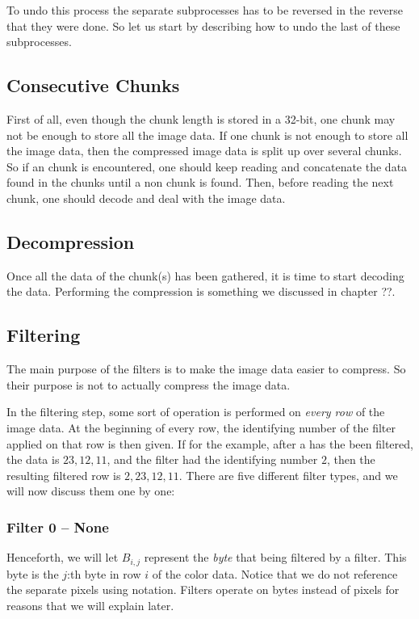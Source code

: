 To undo this process the separate subprocesses has to be reversed in
the reverse that they were done. So let us start by describing how to
undo the last of these subprocesses.

\subsection{Consecutive Chunks}

First of all, even though the chunk length is stored in a 32-bit, one
chunk may not be enough to store all the image data. If one chunk is
not enough to store all the image data, then the compressed image data
is split up over several \IDAT chunks. So if an \IDAT chunk is
encountered, one should keep reading and concatenate the data found in
the \IDAT chunks until a non \IDAT chunk is found. Then, before
reading the next chunk, one should decode and deal with the image
data.

\subsection{Decompression}

Once all the data of the \IDAT chunk(s) has been gathered, it is time
to start decoding the data. Performing the compression is something we
discussed in chapter ??. 

\subsection{Filtering}

The main purpose of the filters is to make the image data easier to
compress. So their purpose is not to actually compress the image data.

In the filtering step, some sort of operation is performed on
\textit{every row} of the image data. At the beginning of every row,
the identifying number of the filter applied on that row is then
given. If for the example, after a has the been filtered, the data is
$23,12,11$, and the filter had the identifying number $2$, then the
resulting filtered row is $2,23,12,11$. There are five different
filter types, and we will now discuss them one by one:

\subsubsection{Filter 0 -- None}

Henceforth, we will let $B_{i,j}$ represent the \textit{byte} that
being filtered by a filter. This byte is the $j$:th byte in row $i$ of
the color data. Notice that we do not reference the separate pixels
using notation. Filters operate on bytes instead of pixels for reasons
that we will explain later.



